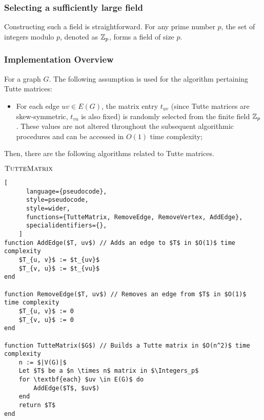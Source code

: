 \subsubsection{Selecting a sufficiently large field}
Constructing such a field is straightforward. 
For any prime number \(p\), the set of integers modulo \(p\), denoted as \(\mathbb{Z}_{p}\), forms a field of size \(p\).

\subsubsection{Implementation Overview}

For a graph \(G\). The following assumption is used for the algorithm pertaining Tutte matrices:
\begin{itemize}
    \item For each edge \(uv \in E(G)\), the matrix entry \(t_{uv}\) (since Tutte matrices are skew-symmetric, \(t_{vu}\) is also fixed) is randomly selected from the finite field \(\mathbb{Z}_p\). 
    These values are not altered throughout the subsequent algorithmic procedures and can be accessed in $O(1)$ time complexity;
\end{itemize}
Then, there are the following algorithms related to Tutte matrices.

\begin{programruledcaption}{\(\textsc{TutteMatrix}\)}
    \label{alg:tuttematrix}
    \begin{lstlisting}[
      language={pseudocode},
      style=pseudocode,
      style=wider,
      functions={TutteMatrix, RemoveEdge, RemoveVertex, AddEdge},
      specialidentifiers={},
    ]
function AddEdge($T, uv$) // Adds an edge to $T$ in $O(1)$ time complexity
    $T_{u, v}$ := $t_{uv}$
    $T_{v, u}$ := $t_{vu}$
end

function RemoveEdge($T, uv$) // Removes an edge from $T$ in $O(1)$ time complexity
    $T_{u, v}$ := 0
    $T_{v, u}$ := 0
end

function TutteMatrix($G$) // Builds a Tutte matrix in $O(n^2)$ time complexity
    n := $|V(G)|$
    Let $T$ be a $n \times n$ matrix in $\Integers_p$
    for \textbf{each} $uv \in E(G)$ do
        AddEdge($T$, $uv$)
    end
    return $T$
end
    \end{lstlisting}
\end{programruledcaption}

